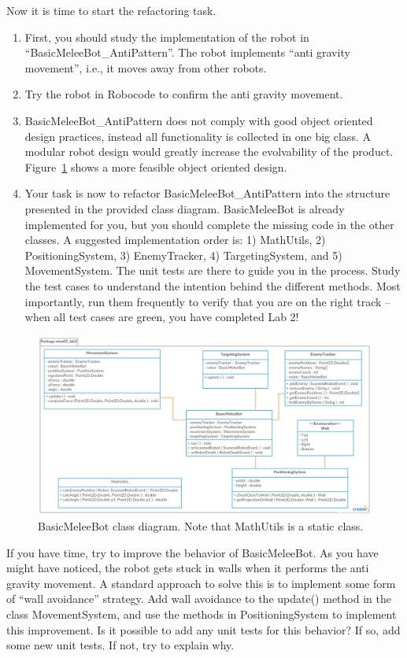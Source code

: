 \documentclass{scrreprt}
\begin{document}
Now it is time to start the refactoring task. 
\begin{enumerate}
\item First, you should study the implementation of the robot in ``BasicMeleeBot_AntiPattern''. The robot implements ``anti gravity movement'', i.e., it moves away from other robots. 
\item Try the robot in Robocode to confirm the anti gravity movement.
\item BasicMeleeBot_AntiPattern does not comply with good object oriented design practices, instead all functionality is collected in one big class. A modular robot design would greatly increase the evolvability of the product. Figure~\ref{fig:classDiagram} shows a more feasible object oriented design. 
\item Your task is now to refactor BasicMeleeBot_AntiPattern into the structure presented in the provided class diagram. BasicMeleeBot is already implemented for you, but you should complete the missing code in the other classes. A suggested implementation order is: 1) MathUtils, 2) PositioningSystem, 3) EnemyTracker, 4) TargetingSystem, and 5) MovementSystem. The unit tests are there to guide you in the process. Study the test cases to understand the intention behind the different methods. Most importantly, run them frequently to verify that you are on the right track -- when all test cases are green, you have completed Lab 2!
\end{enumerate}

\begin{figure}
\centering
\includegraphics[width=1.1\textwidth]{figures/BasicMeleeBotClassDiagram.png}
\caption{BasicMeleeBot class diagram. Note that MathUtils is a static class.}
\label{fig:classDiagram}
\end{figure}

If you have time, try to improve the behavior of BasicMeleeBot. As you have might have noticed, the robot gets stuck in walls when it performs the anti gravity movement. A standard approach to solve this is to implement some form of ``wall avoidance'' strategy. Add wall avoidance to the update() method in the class MovementSystem, and use the methods in PositioningSystem to implement this improvement. Is it possible to add any unit tests for this behavior? If so, add some new unit tests. If not, try to explain why.
\end{document}
